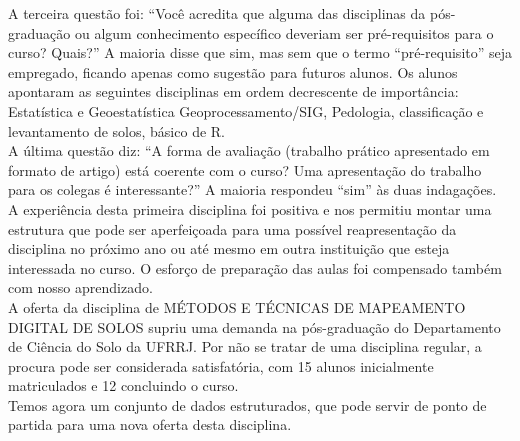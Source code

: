 A terceira questão foi: ``Você acredita que alguma das disciplinas da pós-graduação ou algum conhecimento específico deveriam ser pré-requisitos para o curso? Quais?'' A maioria disse que sim, mas sem que o termo ``pré-requisito'' seja empregado, ficando apenas como sugestão para futuros alunos. Os alunos apontaram as seguintes disciplinas em ordem decrescente de importância: Estatística e Geoestatística Geoprocessamento/SIG, Pedologia, classificação e levantamento de solos, básico de R.\\
A última questão diz: ``A forma de avaliação (trabalho prático apresentado em formato de artigo) está coerente com o curso? Uma apresentação do trabalho para os colegas é interessante?'' A maioria respondeu ``sim'' às duas indagações.\\
A experiência desta primeira disciplina foi  positiva e nos permitiu montar uma estrutura que pode ser aperfeiçoada para uma possível reapresentação da disciplina no próximo ano ou até mesmo em outra instituição que esteja interessada no curso. O esforço de preparação das aulas foi compensado também com nosso aprendizado.\\
A oferta da disciplina de MÉTODOS E TÉCNICAS DE MAPEAMENTO DIGITAL DE SOLOS supriu uma demanda na pós-graduação do Departamento de Ciência do Solo da UFRRJ. Por não se tratar de uma disciplina regular, a procura pode ser considerada satisfatória, com 15 alunos inicialmente matriculados e 12 concluindo o curso.\\
Temos agora um conjunto de dados estruturados, que pode servir de ponto de partida para uma nova oferta desta disciplina.\\

\address{Waldir de Carvalho Junior\\
Embrapa Solos\\
\url{www.cnps.embrapa.br}\\
}\\
\address{Cesar da Silva Chagas\\
Embrapa Solos\\
}\\
\address{Michele Duarte de Menezes\\
Universidade Federal Rural do Rio de Janeiro\\
}
